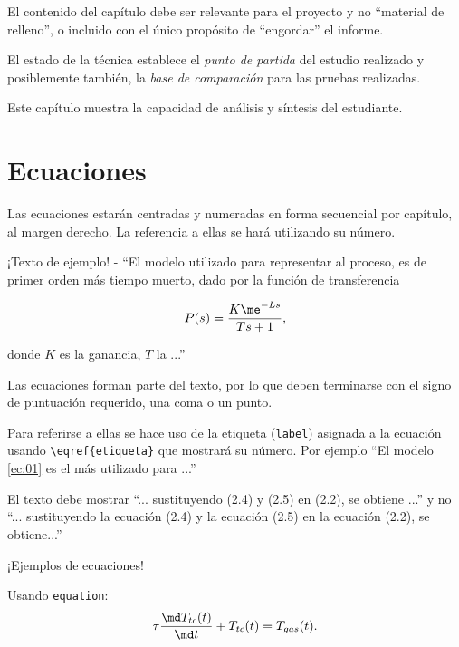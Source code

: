 El contenido del capítulo debe ser relevante para el proyecto y no ``material de relleno'', o incluido con el único propósito de ``engordar'' el informe.

El estado de la técnica establece el \emph{punto de partida} del estudio realizado y posiblemente también, la \emph{base de comparación} para las pruebas realizadas.

Este capítulo muestra la capacidad de análisis y síntesis del estudiante.
 
\section{Ecuaciones}
Las ecuaciones estarán centradas y numeradas en forma secuencial por capítulo, al margen derecho.  La referencia a ellas se hará utilizando su número.

¡Texto de ejemplo! - ``El modelo utilizado para representar al proceso, es de primer orden más tiempo muerto, dado por la función de transferencia

\begin{equation}  %
	P(s) = \frac{K \me^{-Ls}}{Ts+1}, \label{ec:01}
\end{equation}

\noindent donde $K$ es la ganancia, $T$ la ...''  

Las ecuaciones forman parte del texto, por lo que deben terminarse con el signo de puntuación requerido, una coma o un punto.

Para referirse a ellas se hace uso de la etiqueta (\texttt{label}) asignada a la ecuación usando \texttt{\textbackslash eqref\{etiqueta\}} que mostrará su número.  Por ejemplo ``El modelo \eqref{ec:01} es el más utilizado para ...''

El texto debe mostrar ``... sustituyendo (2.4) y (2.5) en (2.2), se obtiene ...'' y no ``... sustituyendo la ecuación (2.4) y la ecuación (2.5) en la ecuación (2.2), se obtiene...''  

¡Ejemplos de ecuaciones!

Usando \texttt{equation}:
\begin{equation}
	\tau \frac{\md T_{tc}(t)}{\md t} + T_{tc}(t) = T_{gas}(t).
\end{equation}

